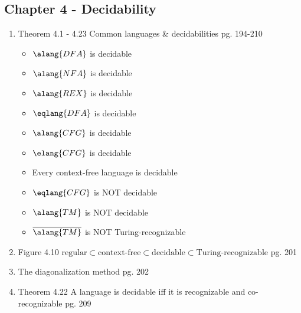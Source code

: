 \documentclass[12pt]{article} %
\newcommand{\theoremitem}[3]{\item #1 \quad #2 \dotfill #3}
\newenvironment{theoremlist} {
    \begin{enumerate}[nosep,leftmargin=*,label={}]
} {
    \end{enumerate}
}
\begin{document}
\subsection{Chapter 4 - Decidability}
\begin{theoremlist}
    \theoremitem{Theorem 4.1 - 4.23}
    {Common languages \& decidabilities}
    {pg. 194-210}
    \begin{multicols}{2}
    \begin{itemize}[nosep]
        \item $\alang{DFA}$  is decidable 
        \item $\alang{NFA}$  is decidable 
        \item $\alang{REX}$  is decidable 
        \item $\eqlang{DFA}$ is decidable
        \item $\alang{CFG}$  is decidable 
        \item $\elang{CFG}$  is decidable 
        \item Every context-free language is decidable
        \item $\eqlang{CFG}$ is NOT decidable
        \item $\alang{TM}$ is NOT decidable 
        \item $\overline{\alang{TM}}$ is NOT Turing-recognizable 
    \end{itemize}
    \end{multicols}
    \theoremitem{Figure 4.10}
    {\textbf{$\text{regular}\subset\text{context-free}\subset\text{decidable}\subset\text{Turing-recognizable}$}}
    {pg. 201}
    \theoremitem{The diagonalization method}
    {}
    {pg. 202}
    \theoremitem{Theorem 4.22}
    {A language is decidable iff it is recognizable and co-recognizable}
    {pg. 209}


\end{theoremlist}
\end{document}
